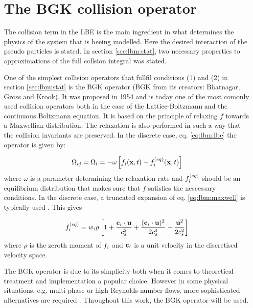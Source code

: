 \section{The BGK collision operator}\label{sec:lbm:col}
The collision term in the LBE is the main ingredient in what
determines the physics of the system that is beeing modelled. Here the
desired interaction of the pseudo particles is stated. In section
\ref{sec:lbm:stat}, two necessary properties to approximations of the
full collsion integral was stated.

One of the simplest collision operators that fullfil conditions (1)
and (2) in section \ref{sec:lbm:stat} is the BGK operator (BGK from
its creators: Bhatnagar, Gross and Krook). It was proposed in 1954 and
is today one of the most comonly used collision operators both in the
case of the Lattice-Boltzmann and the continuous Boltzmann
equation. It is based on the principle of relaxing $f$ towards a
Maxwellian distribution. The relaxation is also performed in such a
way that the collision invariants are preserved.  In the discrete case,
eq. \eqref{eq:lbm:lbe} the operator is given by:

\begin{equation}\label{eq:lbm:bgk}
\Omega_{ij} = \Omega_i = -\omega \left[ f_i(\mathbf{x}, t) - f_i^{(eq)}(\mathbf{x}, t)
  \right]
\end{equation}
where $\omega$ is a parameter determining the relaxation rate and
$f_i^{(eq)}$ should be an equilibrium distribution that makes sure that $f$
satisfies the nescessary conditions. In the discrete case, a truncated
expansion of eq. \eqref{eq:lbm:maxwell} is typically used
\cite{wolf-gladrow}. This gives


\begin{equation}
f_i^{(eq)} = w_i\rho \left [ 1 + \frac{\mathbf{c}_i \cdot \mathbf{u}}{c_s^2} +
  \frac{(\mathbf{c}_i \cdot \mathbf{u})^2}{2c_s^4} - \frac{\mathbf{u}^2}{2c_s^2} \right]
\end{equation}
where $\rho$ is the zeroth moment of $f_i$ and $\mathbf{c}_i$ is a unit
velocity in the discretised velocity space. 

The BGK operator is due to its simplicity both when it comes to
theoretical treatment and implementation a popular choice. However in
some physical situations, e.g. multi-phase or high Reynolds-number
flows, more sophisticated alternatives are required
\cite{wolf-gladrow}. Throughout this work, the BGK operator will be
used.
